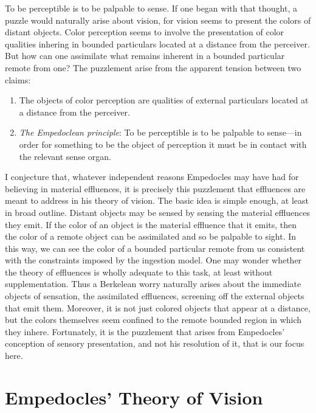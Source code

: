 To be perceptible is to be palpable to sense. If one began with that thought, a puzzle would naturally arise about vision, for vision seems to present the colors of distant objects. Color perception seems to involve the presentation of color qualities inhering in bounded particulars located at a distance from the perceiver. But how can one assimilate what remains inherent in a bounded particular remote from one? The puzzlement arise from the apparent tension between two claims:
\begin{enumerate}[(1)]
    \item The objects of color perception are qualities of external particulars located at a distance from the perceiver.
    \item \emph{The Empedoclean principle}: To be perceptible is to be palpable to sense---in order for something to be the object of perception it must be in contact with the relevant sense organ.
\end{enumerate}

I conjecture that, whatever independent reasons Empedocles may have had for believing in material effluences, it is precisely this puzzlement that effluences are meant to address in his theory of vision. The basic idea is simple enough, at least in broad outline. Distant objects may be sensed by sensing the material effluences they emit. If the color of an object is the material effluence that it emits, then the color of a remote object can be assimilated and so be palpable to sight. In this way, we can see the color of a bounded particular remote from us  consistent with the constraints imposed by the ingestion model. One may wonder whether the theory of effluences is wholly adequate to this task, at least without supplementation. Thus a Berkelean worry naturally arises about the immediate objects of sensation, the assimilated effluences, screening off the external objects that emit them. Moreover, it is not just colored objects that appear at a distance, but the colors themselves seem confined to the remote bounded region in which they inhere. Fortunately, it is the puzzlement that arises from Empedocles' conception of sensory presentation, and not his resolution of it, that is our focus here. 


\section{Empedocles' Theory of Vision} %
\label{sec:empedocles_theory_of_vision}

